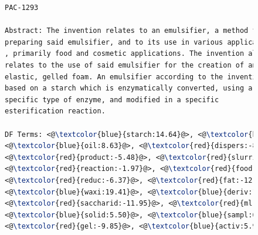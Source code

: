 \begin{figure}[htpb]
\begin{framed}
\vspace*{-2ex}
  \centering
 \begin{lstlisting}[basicstyle=\small\ttfamily , linewidth=\columnwidth,breaklines=true, language=TeX] 
PAC-1293

Abstract: The invention relates to an emulsifier, a method for 
preparing said emulsifier, and to its use in various applications
, primarily food and cosmetic applications. The invention also 
relates to the use of said emulsifier for the creation of an 
elastic, gelled foam. An emulsifier according to the invention is 
based on a starch which is enzymatically converted, using a 
specific type of enzyme, and modified in a specific 
esterification reaction.

DF Terms: <@\textcolor{blue}{starch:14.64}@>, <@\textcolor{blue}{enzym:29.49}@>, <@\textcolor{red}{amylos:-20.15}@>, 
<@\textcolor{blue}{oil:8.63}@>, <@\textcolor{red}{dispers:-8.66}@>, <@\textcolor{red}{ph:-4.55}@>, <@\textcolor{red}{dry:-6.21}@>, <@\textcolor{red}{heat:-2.26}@>, 
<@\textcolor{red}{product:-5.48}@>, <@\textcolor{red}{slurri:-11.48}@>, <@\textcolor{blue}{viscos:7.77}@>, <@\textcolor{red}{composit:-4.49}@>, 
<@\textcolor{red}{reaction:-1.97}@>, <@\textcolor{red}{food:-11.94}@>, <@\textcolor{blue}{agent:5.19}@>, <@\textcolor{red}{debranch:-10.58}@>, 
<@\textcolor{red}{reduc:-6.37}@>, <@\textcolor{red}{fat:-12.83}@>, <@\textcolor{red}{prepar:-0.82}@>, <@\textcolor{red}{hour:-5.42}@>, 
<@\textcolor{blue}{waxi:19.41}@>, <@\textcolor{blue}{deriv:11.97}@>, <@\textcolor{red}{content:-3.38}@>, <@\textcolor{blue}{aqueou:0.38}@>, 
<@\textcolor{red}{saccharid:-11.95}@>, <@\textcolor{red}{ml:-0.79}@>, <@\textcolor{red}{cook:-10.04}@>, <@\textcolor{blue}{modifi:5.65}@>, 
<@\textcolor{blue}{solid:5.50}@>, <@\textcolor{blue}{sampl:6.27}@>, <@\textcolor{blue}{mix:2.48}@>, <@\textcolor{red}{minut:-1.68}@>, <@\textcolor{red}{dri:-0.91}@>, 
<@\textcolor{red}{gel:-9.85}@>, <@\textcolor{blue}{activ:5.98}@>, <@\textcolor{red}{corn:-5.27}@>, <@\textcolor{blue}{alpha:12}@>, <@\textcolor{red}{sprai:-2.74}@> 


\end{lstlisting}
\end{framed}
\end{figure}

